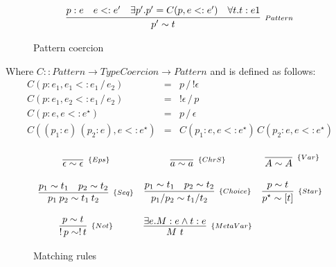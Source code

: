\begin{figure*}[ht]
    \[
        \begin{array}{ccc}
            \multicolumn{3}{c}{
                \infer[_{Pattern}]
                    {p' \sim t}
                    {p : e & e <: e' & \exists p' . p' = C(p, e <: e') & \forall t. t:e1}
            }
        \end{array}
    \]
    \centering
    \caption{Pattern coercion}
    \label{fig:pattern-coercion}
\end{figure*}
Where \(C :: Pattern \to Type Coercion \to Pattern\) and is defined as follows:
\[
    \begin{array}{lcl}
        C(p:e_1, e_1 <: e_1 \,/\, e_2) & = & p \,/\, !\epsilon \\
        C(p:e_1, e_2 <: e_1 \,/\, e_2) & = & !\epsilon \,/\, p \\
        C(p:e, e <: e^\star) & = & p \,/\, \epsilon \\
        C((p_1:e)\,(p_2:e), e <: e^\star) & = & C(p_1:e, e <: e^\star) \, C(p_2:e, e <: e^\star) \\
    \end{array}
\]



\begin{figure*}[ht]
    \[
        \begin{array}{ccc}
            \infer[_{\{Eps\}}]{\epsilon \sim \epsilon}{} &

            \infer[_{\{ChrS\}}]{a \sim a}{} &

            \infer[_{\{Var\}}]{A \sim A}{} \\ \\

            \infer[_{\{Seq\}}]
                {p_1\:p_2 \sim t_1\:t_2}
                {p_1 \sim t_1 & p_2 \sim t_2} &

            \infer[_{\{Choice\}}]
                {p_1 / p_2 \sim t_1 / t_2}
                {p_1 \sim t_1 & p_2 \sim t_2} &

            \infer[_{\{Star\}}]
                {p^\star \sim [t]}
                {p \sim t} \\ \\

            \infer[_{\{Not\}}]
                {!\,p \sim !\,t}
                {p \sim t} &

            \infer[_{\{MetaVar\}}]{M ~ t}{\exists e. M:e \land t:e} &

            \\
        \end{array}
    \]
    \centering
    \caption{Matching rules}
    \label{fig:matching-rules}
\end{figure*}

\cleardoublepage